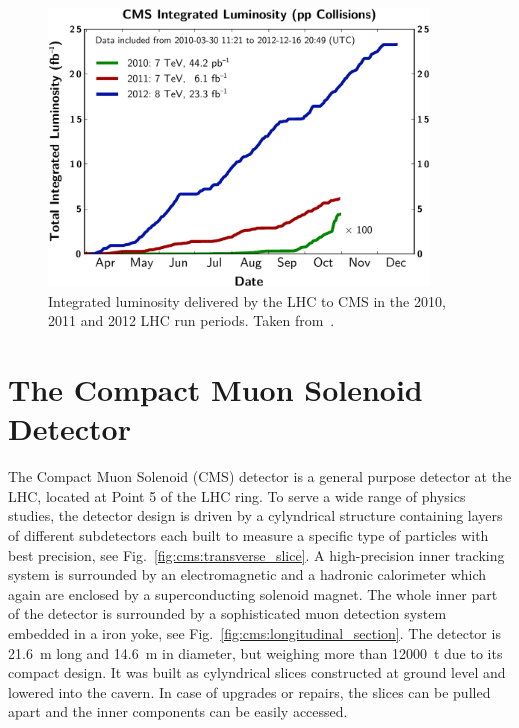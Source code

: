 \begin{figure}[htp]
    \centering
    \includegraphics[width=0.9\textwidth]{figures/cms_detector/lumi_integrated.pdf}
    \caption[Integrated luminosity delivered to CMS]{Integrated luminosity
        delivered by the LHC to CMS in the 2010, 2011 and 2012 LHC run periods.
        Taken from~\cite{Berger:2014aca}.}
    \label{fig:cms:lumi_integrated}
\end{figure}


\section{The Compact Muon Solenoid Detector}

The Compact Muon Solenoid (CMS) detector is a general purpose detector at the
LHC, located at Point 5 of the LHC ring. To serve a wide range of physics
studies, the detector design is driven by a cylyndrical structure containing
layers of different subdetectors each built to measure a specific type of
particles with best precision, see Fig.~\ref{fig:cms:transverse_slice}. A
high-precision inner tracking system is surrounded by an electromagnetic and a
hadronic calorimeter which again are enclosed by a superconducting solenoid
magnet. The whole inner part of the detector is surrounded by a sophisticated
muon detection system embedded in a iron yoke, see
Fig.~\ref{fig:cms:longitudinal_section}. The detector is \SI{21.6}{\meter}
long and \SI{14.6}{\meter} in diameter, but weighing more than
\SI{12000}{\tonne} due to its compact design.  It was built as cylyndrical
slices constructed at ground level and lowered into the cavern. In case of
upgrades or repairs, the slices can be pulled apart and the inner components can
be easily accessed.

